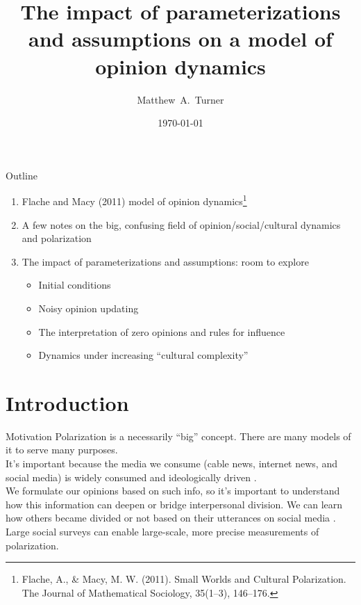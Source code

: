 \documentclass[11pt]{beamer}
\title[]{The impact of parameterizations and assumptions on a model of opinion dynamics}
\author[M.~A.~Turner]{
  {Matthew~A.~Turner}
}
\date{\today}
\begin{document}
\maketitle

\begin{frame}{Outline}
  \begin{enumerate}
    \item Flache and Macy (2011) model of opinion dynamics\footnote{Flache, A., \& Macy, M. W. (2011). Small Worlds and Cultural Polarization. The Journal of Mathematical Sociology, 35(1–3), 146–176.}
    \item A few notes on the big, confusing field of opinion/social/cultural
      dynamics and polarization
    \item The impact of parameterizations and assumptions: room to explore
      \begin{itemize}
        \item Initial conditions
        \item Noisy opinion updating
        \item The interpretation of zero opinions and rules for influence
        \item Dynamics under increasing ``cultural complexity''
      \end{itemize}
  \end{enumerate}
\end{frame}

\section{Introduction}

\begin{frame}{Motivation}
  Polarization is a necessarily ``big'' concept. There are many models of it to serve many 
  purposes. 
  \\[1em]
  It's important because the media we consume (cable news, internet news, and
  social media) is widely consumed and ideologically driven \cite{Pew2014}.
  \\[1em]
  We formulate our opinions based on such info, so it's important to understand
  how this information can deepen or bridge interpersonal division. We can
  learn how others became divided or not based on their utterances on
  social media \cite{Borge-Holthoefer2014, Morales2015a}.
  \\[1em]
  Large social surveys can enable large-scale, more precise measurements of
  polarization.  
\end{frame}
\end{document}
